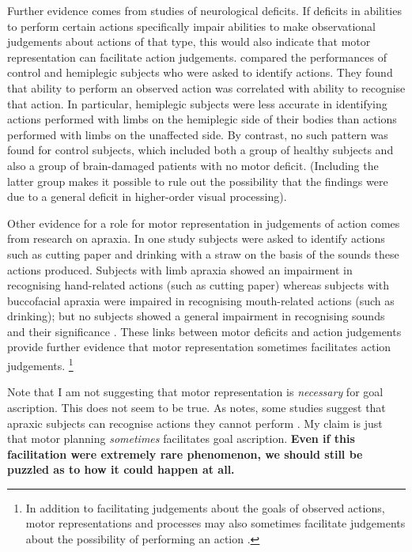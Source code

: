 \documentclass[12pt,\papersize]{extarticle}
\begin{document}
Further evidence comes from  studies of neurological deficits. If deficits in abilities to perform certain actions specifically impair abilities to make observational judgements about actions of that type, this would also indicate that motor representation can facilitate action judgements.  \citet{serino:2009_lesions_} compared the performances of control and hemiplegic subjects who were asked to identify actions. They found that ability to perform an observed action was correlated with ability to recognise that action. In particular, hemiplegic subjects were less accurate in identifying actions performed with limbs on the hemiplegic side of their bodies than actions performed with limbs on the unaffected side. By contrast, no such pattern was found for control subjects, which included both a group of healthy subjects and also a group of brain-damaged patients with no motor deficit.  (Including the latter group makes it possible to rule out the possibility that the findings were due to a general deficit in higher-order visual processing). 

Other evidence for a role for motor representation in judgements of action comes from research on apraxia. In one study subjects were asked to identify actions such as cutting paper and drinking with a straw on the basis of the sounds these actions produced. Subjects with limb apraxia showed an impairment in recognising hand-related actions (such as cutting paper) whereas subjects with buccofacial apraxia were impaired in recognising mouth-related actions (such as drinking); but no subjects showed a general impairment in recognising sounds and their significance \citep{pazzaglia:2008_sound_}. These links between motor deficits and action judgements provide further evidence that motor representation sometimes facilitates action judgements.%
\footnote{
In addition to facilitating judgements about the goals of observed actions, motor representations and processes may also sometimes facilitate judgements about the possibility of performing an action \citep{grosjean:2007_fitts_law, eskenazi:2009_role}.
}

Note that I am not suggesting that motor representation is \emph{necessary} for goal ascription.
This does not seem to be true.
As \citet{mahon:2008_action} notes, some studies suggest that apraxic subjects can recognise actions they cannot perform \citep[see also][]{hickok:2009_eight}. 
My claim is just that motor planning \emph{sometimes} facilitates goal ascription.
\textbf{Even if this facilitation were extremely rare phenomenon, we should still be puzzled as to how it could happen at all.}
\end{document}
